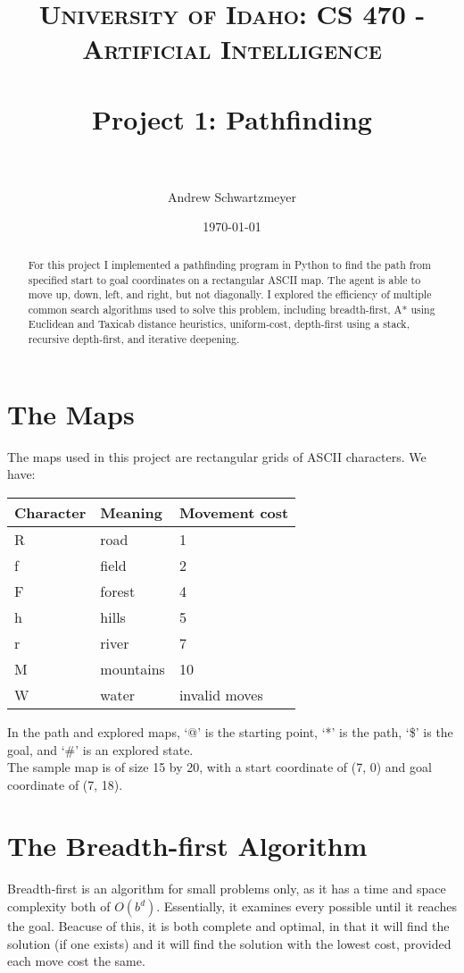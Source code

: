 \documentclass[12pt, article]{scrartcl}
\title{	
\normalfont \normalsize 
\textsc{University of Idaho: CS 470 - Artificial Intelligence} \\ [25pt]
\horrule{0.5pt} \\[0.4cm]
\huge Project 1: Pathfinding\\
\horrule{2pt} \\[0.5cm]
}
\author{Andrew Schwartzmeyer}
\date{\normalsize\today}
\begin{document}
\maketitle %
\begin{abstract}
For this project I implemented a pathfinding program in Python to find the path from specified start to goal coordinates on a rectangular ASCII map. The agent is able to move up, down, left, and right, but not diagonally. I explored the efficiency of multiple common search algorithms used to solve this problem, including breadth-first, A* using Euclidean and Taxicab distance heuristics, uniform-cost, depth-first using a stack, recursive depth-first, and iterative deepening.
\end{abstract}
\pagebreak
\section{The Maps}
The maps used in this project are rectangular grids of ASCII characters. We have:
\begin{center}
\begin{tabular}{l | l | l}
Character & Meaning & Movement cost \\ \hline
R & road & 1 \\
f & field & 2 \\
F & forest & 4 \\
h & hills & 5 \\
r & river & 7 \\
M & mountains & 10 \\
W & water & invalid moves \\
\end{tabular}
\end{center}

In the path and explored maps, `@' is the starting point, `*' is the path, `\$' is the goal, and `\#' is an explored state. \\ 

The sample map is of size 15 by 20, with a start coordinate of (7, 0) and goal coordinate of (7, 18). \\

\section{The Breadth-first Algorithm}
Breadth-first is an algorithm for small problems only, as it has a time and space complexity both of $O(b^{d})$. Essentially, it examines every possible until it reaches the goal. Beacuse of this, it is both complete and optimal, in that it will find the solution (if one exists) and it will find the solution with the lowest cost, provided each move cost the same. \\
\end{document}
